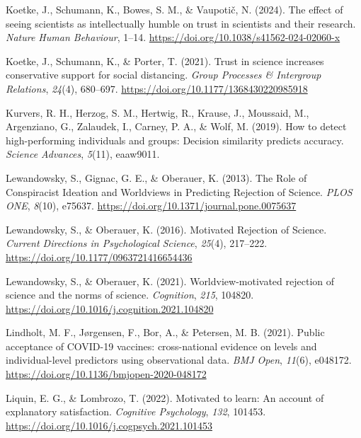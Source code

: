 \documentclass[
  man,
  floatsintext,
  longtable,
  nolmodern,
  notxfonts,
  notimes,
  colorlinks=true,linkcolor=blue,citecolor=blue,urlcolor=blue]{apa7}
\newlength{\cslhangindent}
\newenvironment{CSLReferences}[2] %
 {\begin{list}{}{%
  \setlength{\itemindent}{0pt}
  \setlength{\leftmargin}{0pt}
  \setlength{\parsep}{0pt}
  \ifodd #1
   \setlength{\leftmargin}{\cslhangindent}
   \setlength{\itemindent}{-1\cslhangindent}
  \fi
  \setlength{\itemsep}{#2\baselineskip}}}
 {\end{list}}
\begin{document}
\begin{CSLReferences}{1}{0}
Koetke, J., Schumann, K., Bowes, S. M., \& Vaupotič, N. (2024). The
effect of seeing scientists as intellectually humble on trust in
scientists and their research. \emph{Nature Human Behaviour}, 1--14.
\url{https://doi.org/10.1038/s41562-024-02060-x}

Koetke, J., Schumann, K., \& Porter, T. (2021). Trust in science
increases conservative support for social distancing. \emph{Group
Processes \& Intergroup Relations}, \emph{24}(4), 680--697.
\url{https://doi.org/10.1177/1368430220985918}

Kurvers, R. H., Herzog, S. M., Hertwig, R., Krause, J., Moussaid, M.,
Argenziano, G., Zalaudek, I., Carney, P. A., \& Wolf, M. (2019). How to
detect high-performing individuals and groups: Decision similarity
predicts accuracy. \emph{Science Advances}, \emph{5}(11), eaaw9011.

Lewandowsky, S., Gignac, G. E., \& Oberauer, K. (2013). The Role of
Conspiracist Ideation and Worldviews in Predicting Rejection of Science.
\emph{PLOS ONE}, \emph{8}(10), e75637.
\url{https://doi.org/10.1371/journal.pone.0075637}

Lewandowsky, S., \& Oberauer, K. (2016). Motivated Rejection of Science.
\emph{Current Directions in Psychological Science}, \emph{25}(4),
217--222. \url{https://doi.org/10.1177/0963721416654436}

Lewandowsky, S., \& Oberauer, K. (2021). Worldview-motivated rejection
of science and the norms of science. \emph{Cognition}, \emph{215},
104820. \url{https://doi.org/10.1016/j.cognition.2021.104820}

Lindholt, M. F., Jørgensen, F., Bor, A., \& Petersen, M. B. (2021).
Public acceptance of COVID-19 vaccines: cross-national evidence on
levels and individual-level predictors using observational data.
\emph{BMJ Open}, \emph{11}(6), e048172.
\url{https://doi.org/10.1136/bmjopen-2020-048172}

Liquin, E. G., \& Lombrozo, T. (2022). Motivated to learn: An account of
explanatory satisfaction. \emph{Cognitive Psychology}, \emph{132},
101453. \url{https://doi.org/10.1016/j.cogpsych.2021.101453}


\end{CSLReferences}
\end{document}
